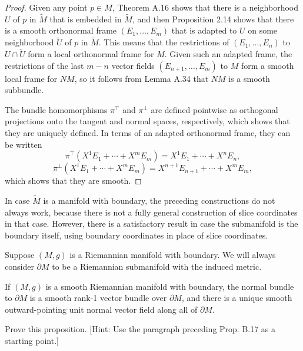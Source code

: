\begin{proof}
Given any point $p \in M$, Theorem A.16 shows that there is a neighborhood $U$ of $p$ in $\widetilde{M}$ that is embedded in $\widetilde{M}$, and then Proposition 2.14 shows that there is a smooth orthonormal frame $(E_1, \ldots, E_m)$ that is adapted to $U$ on some neighborhood $\widetilde{U}$ of $p$ in $\widetilde{M}$. This means that the restrictions of $(E_1, \ldots, E_n)$ to $U \cap \widetilde{U}$ form a local orthonormal frame for $M$. Given such an adapted frame, the restrictions of the last $m - n$ vector fields $(E_{n+1}, \ldots, E_m)$ to $M$ form a smooth local frame for $NM$, so it follows from Lemma A.34 that $NM$ is a smooth subbundle.

The bundle homomorphisms $\pi^\top$ and $\pi^\perp$ are defined pointwise as orthogonal projections onto the tangent and normal spaces, respectively, which shows that they are uniquely defined. In terms of an adapted orthonormal frame, they can be written
\[
\pi^\top(X^1 E_1 + \cdots + X^m E_m) = X^1 E_1 + \cdots + X^n E_n,
\]
\[
\pi^\perp(X^1 E_1 + \cdots + X^m E_m) = X^{n+1} E_{n+1} + \cdots + X^m E_m,
\]
which shows that they are smooth.
\end{proof}

In case $\widetilde{M}$ is a manifold with boundary, the preceding constructions do not always work, because there is not a fully general construction of slice coordinates in that case. However, there is a satisfactory result in case the submanifold is the boundary itself, using boundary coordinates in place of slice coordinates.

Suppose $(M, g)$ is a Riemannian manifold with boundary. We will always consider $\partial M$ to be a Riemannian submanifold with the induced metric.

\begin{proposition}
\label{prop:outward-pointing-normal}
If $(M, g)$ is a smooth Riemannian manifold with boundary, the normal bundle to $\partial M$ is a smooth rank-1 vector bundle over $\partial M$, and there is a unique smooth outward-pointing unit normal vector field along all of $\partial M$.
\end{proposition}

\begin{exercise}
\label{exer:prove-outward-normal}
Prove this proposition. [Hint: Use the paragraph preceding Prop. B.17 as a starting point.]
\end{exercise}

